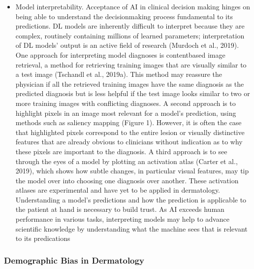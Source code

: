 \documentclass[12pt, a4paper, oneside]{book}   	%
\begin{document}
\begin{itemize}
				\item Model interpretability. Acceptance of \gls{AI} in clinical decision making hinges on being able to understand the decisionmaking process fundamental to its predictions. DL models are inherently difficult to interpret because they are complex, routinely containing millions of learned parameters; interpretation of DL models’ output is an active field of research (Murdoch et al., 2019). One approach for interpreting model diagnoses is contentbased image retrieval, a method for retrieving training images that are visually similar to a test image (Tschandl et al., 2019a). This method may reassure the physician if all the retrieved training images have the same diagnosis as the predicted diagnosis but is less helpful if the test image looks similar to two or more training images with conflicting diagnoses. A second approach is to highlight pixels in an image most relevant for a model’s prediction, using methods such as saliency mapping (Figure 1). However, it is often the case that highlighted pixels correspond to the entire lesion or visually distinctive features that are already obvious to clinicians without indication as to why these pixels are important to the diagnosis. A third approach is to see through the eyes of a model by plotting an activation atlas (Carter et al., 2019), which shows how subtle changes, in particular visual features, may tip the model over into choosing one diagnosis over another. These activation atlases are experimental and have yet to be applied in dermatology. Understanding a model’s predictions and how the prediction is applicable to the patient at hand is necessary to build trust. As \gls{AI} exceeds human performance in various tasks, interpreting models may help to advance scientific knowledge by understanding what the machine sees that is relevant to its predications \autocite{Young_2020}
			\end{itemize}
		\subsubsection{Demographic Bias in Dermatology}
\end{document}
